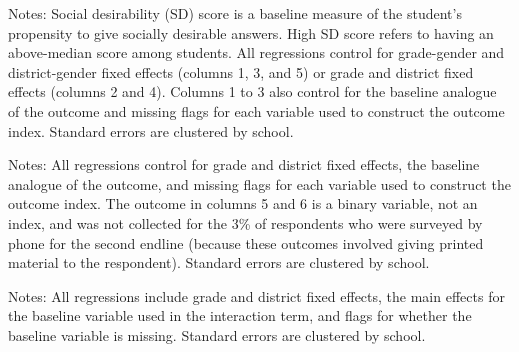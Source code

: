 \documentclass[letterpaper,12pt,pdftex]{article}
\begin{document}
\begin{table}
	\tabcolsep=3.8pt
	\caption{Robustness check for social desirability bias (Endline 2)}
	\label{tab_primary_socialdesirability_el2}
	\vspace{.4cm}
	\begin{center}
		\footnotesize
		
	\end{center}
	\flushleft \scriptsize {Notes: Social desirability (SD) score is a baseline measure of the student's propensity to give socially desirable answers. High SD score refers to having an above-median score among students. All regressions control for grade-gender and district-gender fixed effects (columns 1, 3, and 5) or grade and district fixed effects (columns 2 and 4). Columns 1 to 3 also control for the baseline analogue of the outcome and missing flags for each variable used to construct the outcome index. Standard errors are clustered by school.}
\end{table}
\restoregeometry


\clearpage
\newpage

\begin{landscape}
\begin{table}
	\caption{Gender-specific treatment effects on attitudes, aspirations, and behavior (Endline 2)}
	\label{tab_el2_primary_panels}
	\centering 
		
\flushleft \footnotesize {Notes: All regressions control for grade and district fixed effects, the baseline analogue of the outcome, and missing flags for each variable used to construct the outcome index. The outcome in columns 5 and 6 is a binary variable, not an index, and was not collected for the 3\% of respondents who were surveyed by phone for the second endline (because these outcomes involved giving printed material to the respondent). Standard errors are clustered by school.}
\end{table}
\end{landscape}

\clearpage
\newpage

\normalsize


\begin{table}
\tabcolsep=0.2pt
	\caption{Unpacking the treatment effect on scholarship applications (Endline 2)}
	\label{tab_scholar_bl}
		\vspace{.4cm}
	\begin{center}
		\small
		
	\end{center}
	\flushleft \footnotesize {Notes: All regressions include grade and district fixed effects, the main effects for the baseline variable used in the interaction term, and flags for whether the baseline variable is missing. Standard errors are clustered by school.}
\end{table}
\clearpage
	
\end{document}
